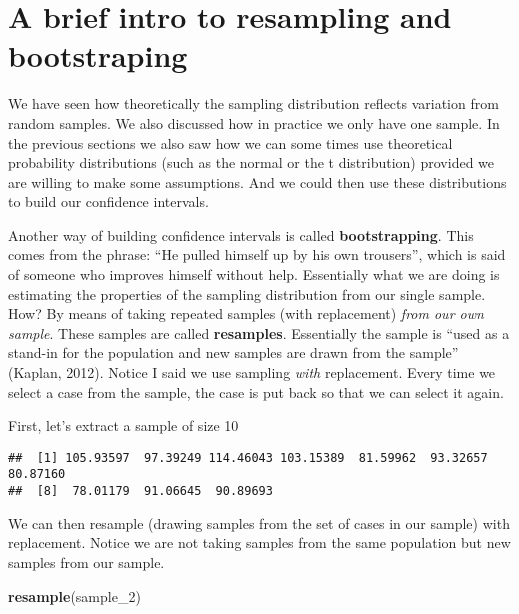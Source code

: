 \documentclass[
]{book}
\newenvironment{Shaded}{\begin{snugshade}}{\end{snugshade}}
\newcommand{\DecValTok}[1]{\textcolor[rgb]{0.00,0.00,0.81}{#1}}
\newcommand{\FunctionTok}[1]{\textcolor[rgb]{0.13,0.29,0.53}{\textbf{#1}}}
\newcommand{\NormalTok}[1]{#1}
\newcommand{\OtherTok}[1]{\textcolor[rgb]{0.56,0.35,0.01}{#1}}
\newcommand{\SpecialCharTok}[1]{\textcolor[rgb]{0.81,0.36,0.00}{\textbf{#1}}}
\begin{document}
\section{A brief intro to resampling and bootstraping}\label{a-brief-intro-to-resampling-and-bootstraping}

We have seen how theoretically the sampling distribution reflects variation from random samples. We also discussed how in practice we only have one sample. In the previous sections we also saw how we can some times use theoretical probability distributions (such as the normal or the t distribution) provided we are willing to make some assumptions. And we could then use these distributions to build our confidence intervals.

Another way of building confidence intervals is called \textbf{bootstrapping}. This comes from the phrase: ``He pulled himself up by his own trousers'', which is said of someone who improves himself without help. Essentially what we are doing is estimating the properties of the sampling distribution from our single sample. How? By means of taking repeated samples (with replacement) \emph{from our own sample}. These samples are called \textbf{resamples}. Essentially the sample is ``used as a stand-in for the population and new samples are drawn from the sample'' (Kaplan, 2012). Notice I said we use sampling \emph{with} replacement. Every time we select a case from the sample, the case is put back so that we can select it again.

First, let's extract a sample of size 10

\begin{Shaded}
\end{Shaded}

\begin{verbatim}
##  [1] 105.93597  97.39249 114.46043 103.15389  81.59962  93.32657  80.87160
##  [8]  78.01179  91.06645  90.89693
\end{verbatim}

We can then resample (drawing samples from the set of cases in our sample) with replacement. Notice we are not taking samples from the same population but new samples from our sample.

\begin{Shaded}
\begin{Highlighting}[]
\FunctionTok{resample}\NormalTok{(sample\_2)}
\end{Highlighting}
\end{Shaded}
\end{document}
